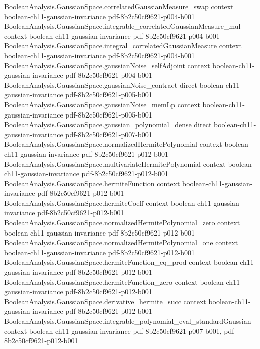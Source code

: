 \begin{theorem}
\proofstep
  {BooleanAnalysis.GaussianSpace.correlatedGaussianMeasure_swap}
  {context}
  {boolean-ch11-gaussian-invariance}
  {pdf-8b2c50cf9621-p004-b001}
\proofstep
  {BooleanAnalysis.GaussianSpace.integrable_correlatedGaussianMeasure_mul}
  {context}
  {boolean-ch11-gaussian-invariance}
  {pdf-8b2c50cf9621-p004-b001}
\proofstep
  {BooleanAnalysis.GaussianSpace.integral_correlatedGaussianMeasure}
  {context}
  {boolean-ch11-gaussian-invariance}
  {pdf-8b2c50cf9621-p004-b001}
\proofstep
  {BooleanAnalysis.GaussianSpace.gaussianNoise_selfAdjoint}
  {context}
  {boolean-ch11-gaussian-invariance}
  {pdf-8b2c50cf9621-p004-b001}
\proofstep
  {BooleanAnalysis.GaussianSpace.gaussianNoise_contract}
  {direct}
  {boolean-ch11-gaussian-invariance}
  {pdf-8b2c50cf9621-p005-b001}
\proofstep
  {BooleanAnalysis.GaussianSpace.gaussianNoise_memLp}
  {context}
  {boolean-ch11-gaussian-invariance}
  {pdf-8b2c50cf9621-p005-b001}
\proofstep
  {BooleanAnalysis.GaussianSpace.gaussian_polynomial_dense}
  {direct}
  {boolean-ch11-gaussian-invariance}
  {pdf-8b2c50cf9621-p007-b001}
\proofstep
  {BooleanAnalysis.GaussianSpace.normalizedHermitePolynomial}
  {context}
  {boolean-ch11-gaussian-invariance}
  {pdf-8b2c50cf9621-p012-b001}
\proofstep
  {BooleanAnalysis.GaussianSpace.multivariateHermitePolynomial}
  {context}
  {boolean-ch11-gaussian-invariance}
  {pdf-8b2c50cf9621-p012-b001}
\proofstep
  {BooleanAnalysis.GaussianSpace.hermiteFunction}
  {context}
  {boolean-ch11-gaussian-invariance}
  {pdf-8b2c50cf9621-p012-b001}
\proofstep
  {BooleanAnalysis.GaussianSpace.hermiteCoeff}
  {context}
  {boolean-ch11-gaussian-invariance}
  {pdf-8b2c50cf9621-p012-b001}
\proofstep
  {BooleanAnalysis.GaussianSpace.normalizedHermitePolynomial_zero}
  {context}
  {boolean-ch11-gaussian-invariance}
  {pdf-8b2c50cf9621-p012-b001}
\proofstep
  {BooleanAnalysis.GaussianSpace.normalizedHermitePolynomial_one}
  {context}
  {boolean-ch11-gaussian-invariance}
  {pdf-8b2c50cf9621-p012-b001}
\proofstep
  {BooleanAnalysis.GaussianSpace.hermiteFunction_eq_prod}
  {context}
  {boolean-ch11-gaussian-invariance}
  {pdf-8b2c50cf9621-p012-b001}
\proofstep
  {BooleanAnalysis.GaussianSpace.hermiteFunction_zero}
  {context}
  {boolean-ch11-gaussian-invariance}
  {pdf-8b2c50cf9621-p012-b001}
\proofstep
  {BooleanAnalysis.GaussianSpace.derivative_hermite_succ}
  {context}
  {boolean-ch11-gaussian-invariance}
  {pdf-8b2c50cf9621-p012-b001}
\proofstep
  {BooleanAnalysis.GaussianSpace.integrable_polynomial_eval_standardGaussian}
  {context}
  {boolean-ch11-gaussian-invariance}
  {pdf-8b2c50cf9621-p007-b001,
    pdf-8b2c50cf9621-p012-b001}

\end{theorem}
